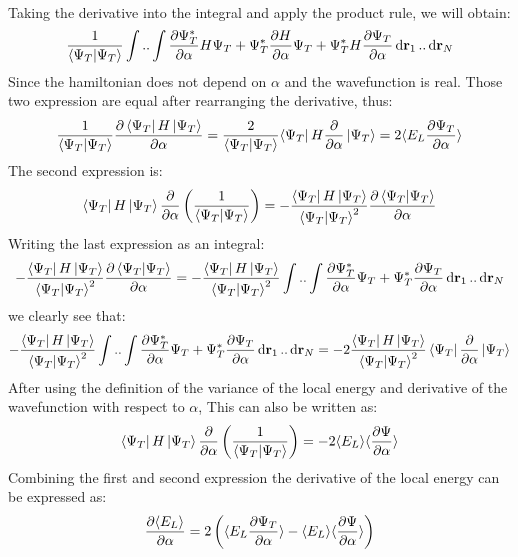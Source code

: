 \documentclass[a4paper, 10pt]{article}
\begin{document}
\begin{appendices}
\begin{align}
\end{align}
Taking the derivative into the integral and apply the product rule, we will obtain:
\begin{align}
\frac{1}{\braket{\Psi_{T}}}\int..\int\pdv{\Psi_{T}^{*}}{\alpha}H\Psi_{T}
+   \Psi_{T}^{*}\pdv{H}{\alpha}\Psi_{T}
+   \Psi_{T}^{*}H\pdv{\Psi_{T}}{\alpha}\dd{\bold{r}_{1}}..\dd{\bold{r}_{N}}
\end{align}
Since the hamiltonian does not depend on $\alpha$ and the wavefunction is real. Those two expression are equal after rearranging the derivative,
thus:
\begin{align}
\frac{1}{\braket{\Psi_{T}}}\pdv{\bra{\Psi_{T}}H\ket{\Psi_{T}}}{\alpha}
= \frac{2}{\braket{\Psi_{T}}}{\bra{\Psi_{T}}H\pdv{\alpha}\ket{\Psi_{T}}}
= 2 \langle E_{L}\pdv{\Psi_{T}}{\alpha} \rangle
\end{align}
The second expression is:
\begin{align}
\bra{\Psi_{T}}H\ket{\Psi_{T}}\pdv{\alpha}\left(\frac{1}{\braket{\Psi_{T}}}\right)
= -\frac{\bra{\Psi_{T}}H\ket{\Psi_{T}}}{\braket{\Psi_{T}}^{2}}\pdv{\braket{\Psi_{T}}}{\alpha}
\end{align}
Writing the last expression as an integral:
\begin{align}
-\frac{\bra{\Psi_{T}}H\ket{\Psi_{T}}}{\braket{\Psi_{T}}^{2}}\pdv{\braket{\Psi_{T}}}{\alpha}
= -\frac{\bra{\Psi_{T}}H\ket{\Psi_{T}}}{\braket{\Psi_{T}}^{2}}\int..\int \pdv{\Psi_{T}^{*}}{\alpha}\Psi_{T} +
\Psi_{T}^{*}\pdv{\Psi_{T}}{\alpha}\dd{\bold{r}_{1}}..\dd{\bold{r}_{N}}
\end{align}
we clearly see that:
\begin{align}
-\frac{\bra{\Psi_{T}}H\ket{\Psi_{T}}}{\braket{\Psi_{T}}^{2}}\int..\int \pdv{\Psi_{T}^{*}}{\alpha}\Psi_{T}
+
\Psi_{T}^{*}\pdv{\Psi_{T}}{\alpha}\dd{\bold{r}_{1}}..\dd{\bold{r}_{N}}
= -2\frac{\bra{\Psi_{T}}H\ket{\Psi_{T}}}{\braket{\Psi_{T}}^{2}}
\bra{\Psi_{T}}\pdv{\alpha}\ket{\Psi_{T}}
\end{align}
After using the definition of the variance of the local energy and derivative of the wavefunction with respect to $\alpha$,
This can also be written as:
\begin{align}
\bra{\Psi_{T}}H\ket{\Psi_{T}}\pdv{\alpha}\left(\frac{1}{\braket{\Psi_{T}}}\right)
= -2\langle E_{L} \rangle \langle \pdv{\Psi}{\alpha}\rangle
\end{align}
Combining the first and second expression the derivative of the local energy can
be expressed as:
\begin{align}
\pdv{\langle E_{L} \rangle }{\alpha} =
2\left(\langle E_{L}\pdv{\Psi_{T}}{\alpha} \rangle -
\langle E_{L} \rangle \langle \pdv{\Psi}{\alpha}\rangle\right)
\end{align} 
	\end{appendices}
\end{document}
